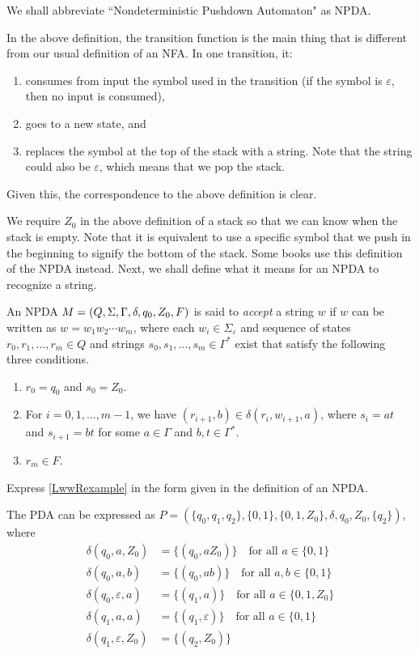 \vspace{2mm}
We shall abbreviate ``Nondeterministic Pushdown Automaton" as NPDA.

In the above definition, the transition function is the main thing that is different from our usual definition of an NFA. In one transition, it:
\begin{enumerate}
    \item consumes from input the symbol used in the transition (if the symbol is $\varepsilon$, then no input is consumed),
    \item goes to a new state, and
    \item replaces the symbol at the top of the stack with a string. Note that the string could also be $\varepsilon$, which means that we pop the stack.
\end{enumerate}
Given this, the correspondence to the above definition is clear.

We require $Z_0$ in the above definition of a stack so that we can know when the stack is empty. Note that it is equivalent to use a specific symbol that we push in the beginning to signify the bottom of the stack. Some books use this definition of the NPDA instead. Next, we shall define what it means for an NPDA to recognize a string.

\begin{definition}
An NPDA $M=(Q,\Sigma,\Gamma,\delta,q_0,Z_0,F)$ is said to \textit{accept} a string $w$ if $w$ can be written as $w=w_1w_2\cdots w_m$, where each $w_i\in\Sigma_\varepsilon$ and sequence of states $r_0,r_1,\ldots,r_m\in Q$ and strings $s_0,s_1,\ldots,s_m\in\Gamma^*$ exist that satisfy the following three conditions.
\begin{enumerate}
    \item $r_0=q_0$ and $s_0=Z_0$.
    \item For $i=0,1,\ldots,m-1$, we have $(r_{i+1},b)\in\delta(r_i,w_{i+1},a)$, where $s_i=at$ and $s_{i+1}=bt$ for some $a\in\Gamma$ and $b,t\in\Gamma^*$.
    \item $r_m\in F$.
\end{enumerate}
\end{definition}

\begin{exercise}
\label{LwwRexercise}
Express \ref{LwwRexample} in the form given in the definition of an NPDA. 
\end{exercise}
\begin{solution}
The PDA can be expressed as $P=(\{q_0,q_1,q_2\}, \{0,1\}, \{0,1,Z_0\}, \delta, q_0,Z_0, \{q_2\})$, where
\begin{align*}
    \delta(q_0,a,Z_0) &= \{(q_0,aZ_0)\}\quad\text{for all $a\in\{0,1\}$} \\
    \delta(q_0,a,b) &= \{(q_0,ab)\}\quad\text{for all $a,b\in\{0,1\}$} \\
    \delta(q_0,\varepsilon,a) &= \{(q_1,a)\}\quad\text{for all $a\in\{0,1,Z_0\}$} \\
    \delta(q_1,a,a) &= \{(q_1,\varepsilon)\}\quad\text{for all $a\in\{0,1\}$} \\
    \delta(q_1,\varepsilon,Z_0) &= \{(q_2,Z_0)\}
\end{align*}
\end{solution}


